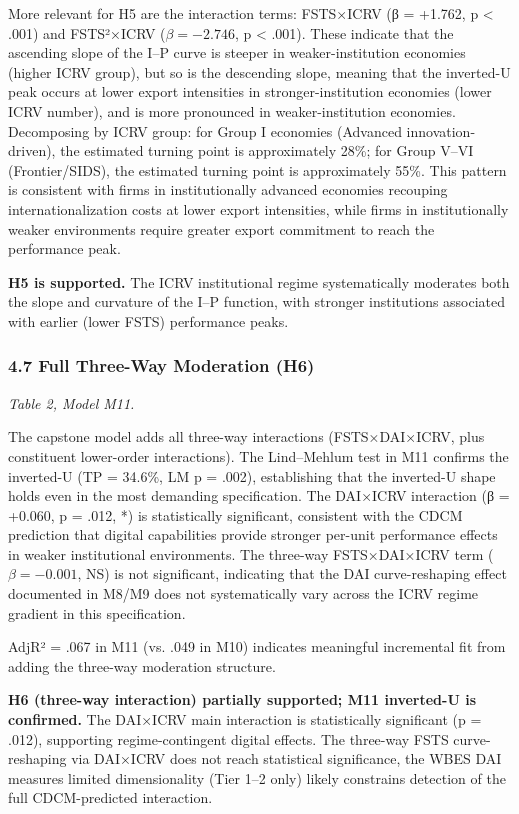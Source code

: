 \documentclass[12pt,a4paper]{article}
\begin{document}
More relevant for H5 are the interaction terms: FSTS×ICRV (β = +1.762, p
\textless{} .001) and FSTS²×ICRV (\(\beta = −2.746\), p \textless{}
.001). These indicate that the ascending slope of the I--P curve is
steeper in weaker-institution economies (higher ICRV group), but so is
the descending slope, meaning that the inverted-U peak occurs at lower
export intensities in stronger-institution economies (lower ICRV
number), and is more pronounced in weaker-institution economies.
Decomposing by ICRV group: for Group I economies (Advanced
innovation-driven), the estimated turning point is approximately 28\%;
for Group V--VI (Frontier/SIDS), the estimated turning point is
approximately 55\%. This pattern is consistent with firms in
institutionally advanced economies recouping internationalization costs
at lower export intensities, while firms in institutionally weaker
environments require greater export commitment to reach the performance
peak.

\textbf{H5 is supported.} The ICRV institutional regime systematically
moderates both the slope and curvature of the I--P function, with
stronger institutions associated with earlier (lower FSTS) performance
peaks.

\hypertarget{47-full-three-way-moderation-h6}{%
\subsubsection{4.7 Full Three-Way Moderation
(H6)}\label{47-full-three-way-moderation-h6}}

\emph{Table 2, Model M11.}

The capstone model adds all three-way interactions (FSTS×DAI×ICRV, plus
constituent lower-order interactions). The Lind--Mehlum test in M11
confirms the inverted-U (TP = 34.6\%, LM p = .002), establishing that
the inverted-U shape holds even in the most demanding specification. The
DAI×ICRV interaction (β = +0.060, p = .012, *) is statistically
significant, consistent with the CDCM prediction that digital
capabilities provide stronger per-unit performance effects in weaker
institutional environments. The three-way FSTS×DAI×ICRV term
(\(\beta = −0.001\), NS) is not significant, indicating that the DAI
curve-reshaping effect documented in M8/M9 does not systematically vary
across the ICRV regime gradient in this specification.

AdjR² = .067 in M11 (vs. .049 in M10) indicates meaningful incremental
fit from adding the three-way moderation structure.

\textbf{H6 (three-way interaction) partially supported; M11 inverted-U
is confirmed.} The DAI×ICRV main interaction is statistically
significant (p = .012), supporting regime-contingent digital effects.
The three-way FSTS curve-reshaping via DAI×ICRV does not reach
statistical significance, the WBES DAI measure\textquotesingle s limited
dimensionality (Tier 1--2 only) likely constrains detection of the full
CDCM-predicted interaction.
\end{document}
